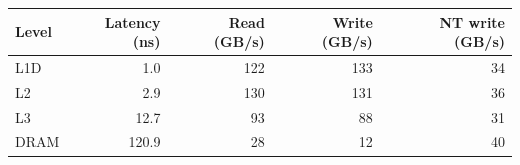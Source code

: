 \begin{tabular}{lrrrr}
\toprule
Level & Latency (ns) & Read (GB/s) & Write (GB/s) & NT write (GB/s) \\
\midrule
L1D & 1.0 & 122 & 133 & 34 \\
L2 & 2.9 & 130 & 131 & 36 \\
L3 & 12.7 & 93 & 88 & 31 \\
DRAM & 120.9 & 28 & 12 & 40 \\
\bottomrule
\end{tabular}
